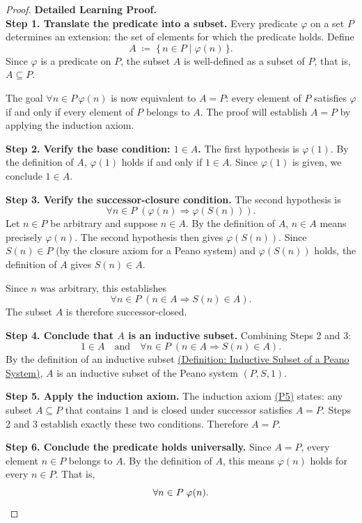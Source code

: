 \begin{proof}
\textbf{Detailed Learning Proof.}~\\

\textbf{Step 1. Translate the predicate into a subset.}
Every predicate $\varphi$ on a set $P$ determines an extension: the set of
elements for which the predicate holds. Define
\[
  A \;\coloneqq\; \{\,n \in P \mid \varphi(n)\,\}.
\]
Since $\varphi$ is a predicate on $P$, the subset $A$ is well-defined as a
subset of $P$, that is, $A \subseteq P$.  

The goal $\forall n \in P\,\varphi(n)$ is now equivalent to $A = P$: every
element of $P$ satisfies $\varphi$ if and only if every element of $P$
belongs to $A$. The proof will establish $A = P$ by applying the induction
axiom.

\textbf{Step 2. Verify the base condition: $1 \in A$.}
The first hypothesis is $\varphi(1)$.
By the definition of $A$, $\varphi(1)$ holds if and only if $1 \in A$.
Since $\varphi(1)$ is given, we conclude $1 \in A$.

\textbf{Step 3. Verify the successor-closure condition.}
The second hypothesis is
\[
  \forall n \in P\;(\varphi(n) \Longrightarrow \varphi(S(n))).
\]
Let $n \in P$ be arbitrary and suppose $n \in A$.
By the definition of $A$, $n \in A$ means precisely $\varphi(n)$.
The second hypothesis then gives $\varphi(S(n))$.
Since $S(n) \in P$ (by the closure axiom for a Peano system) and
$\varphi(S(n))$ holds, the definition of $A$ gives $S(n) \in A$.

Since $n$ was arbitrary, this establishes
\[
  \forall n \in P\;(n \in A \Longrightarrow S(n) \in A).
\]
The subset $A$ is therefore successor-closed.

\textbf{Step 4. Conclude that $A$ is an inductive subset.}
Combining Steps 2 and 3:
\[
  1 \in A
  \quad\text{and}\quad
  \forall n \in P\;(n \in A \Longrightarrow S(n) \in A).
\]
By the definition of an inductive subset
\hyperref[def:inductive-subset-of-peano-system]{(Definition: Inductive Subset of a Peano System)},
$A$ is an inductive subset of the Peano system $(P,S,1)$.

\textbf{Step 5. Apply the induction axiom.}
The induction axiom \hyperref[ax:peano-induction]{(P5)} states: any subset
$A \subseteq P$ that contains $1$ and is closed under successor satisfies
$A = P$. Steps 2 and 3 establish exactly these two conditions. Therefore
$A = P$.

\textbf{Step 6. Conclude the predicate holds universally.}
Since $A = P$, every element $n \in P$ belongs to $A$. By the definition of
$A$, this means $\varphi(n)$ holds for every $n \in P$. That is,
\[
  \forall n \in P\;\varphi(n). \qedhere
\]
\end{proof}

